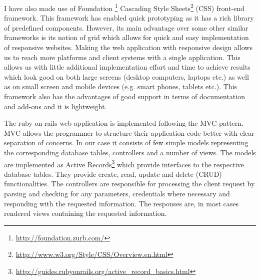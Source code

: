 I have also made use of Foundation \footnote{\url{http://foundation.zurb.com/}} Cascading Style Sheets\footnote{\url{http://www.w3.org/Style/CSS/Overview.en.html}} (CSS) front-end framework. This framework has enabled quick prototyping as it has a rich library of predefined components. However, its main advantage over some other similar frameworks is its notion of grid which allows for quick and easy implementation of responsive websites. Making the web application with responsive design allows us to reach more platforms and client systems with a single application. This allows us with little additional implementation effort and time to achieve results which look good on both large screens (desktop computers, laptops etc.) as well as on small screen and mobile devices (e.g. smart phones, tablets etc.). This framework also has the advantages of good support in terms of documentation and add-ons and it is lightweight.


The ruby on rails web application is implemented following the MVC pattern. MVC allows the programmer to structure their application code better with clear separation of concerns. In our case it consists of few simple models representing the corresponding database tables, controllers and a number of views. The models are implemented as Active Records\footnote{\url{http://guides.rubyonrails.org/active_record_basics.html}} which provide interfaces to the respective database tables. They provide create, read, update and delete (CRUD) functionalities. The controllers are responsible for processing the client request by parsing and checking for any parameters, credentials where necessary and responding with the requested information. The responses are, in most cases rendered views containing the requested information.

